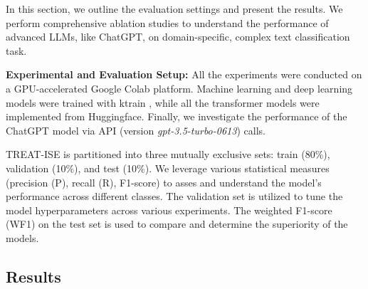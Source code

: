 \documentclass[letterpaper]{article} %
\begin{document}
In this section, we outline the evaluation settings and present the results. We perform comprehensive ablation studies to understand the performance of advanced LLMs, like ChatGPT, on domain-specific, complex text classification task.

\noindent
\textbf{Experimental and Evaluation Setup:} All the experiments were conducted on a GPU-accelerated Google Colab platform. %
Machine learning and deep learning models were trained with ktrain \cite{maiya2020ktrain}, while all the transformer models were implemented from Huggingface. Finally, we investigate the performance of the ChatGPT model via API (version \textit{gpt-3.5-turbo-0613}) calls. 

TREAT-ISE is partitioned into three mutually exclusive sets: train (80\%), validation (10\%), and test (10\%). We leverage various statistical measures (precision (P), recall (R), F1-score) to asses and understand the model's performance across different classes. The validation set is utilized to tune the model hyperparameters across various experiments. The weighted F1-score (WF1) on the test set is used to compare and determine the superiority of the models. 


\subsection{Results}


\end{document}
